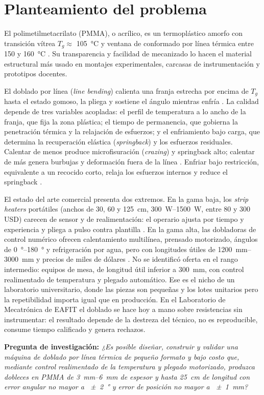 \section{Planteamiento del problema}

El polimetilmetacrilato (PMMA), o acrílico, es un termoplástico amorfo con transición vítrea $T_g \approx$ \SI{105}{\celsius} \cite{gilormini2010,brandrup1999} y ventana de conformado por línea térmica entre \num{150} y \SI{160}{\celsius} \cite{plexiglas_forming,throne2008}. Su transparencia y facilidad de mecanizado lo hacen el material estructural más usado en montajes experimentales, carcasas de instrumentación y prototipos docentes.

El doblado por línea (\emph{line bending}) calienta una franja estrecha por encima de $T_g$ hasta el estado gomoso, la pliega y sostiene el ángulo mientras enfría \cite{osswald2012,throne2008}. La calidad depende de tres variables acopladas: el perfil de temperatura a lo ancho de la franja, que fija la zona plástica; el tiempo de permanencia, que gobierna la penetración térmica y la relajación de esfuerzos; y el enfriamiento bajo carga, que determina la recuperación elástica (\emph{springback}) y los esfuerzos residuales. Calentar de menos produce microfisuración (\emph{crazing}) y springback alto; calentar de más genera burbujas y deformación fuera de la línea \cite{yan2023,plexiglas_forming}. Enfriar bajo restricción, equivalente a un recocido corto, relaja los esfuerzos internos y reduce el springback \cite{osswald2012,yan2023}.

El estado del arte comercial presenta dos extremos. En la gama baja, los \emph{strip heaters} portátiles (anchos de \num{30}, \num{60} y \SI{125}{\centi\meter}, \SIrange{300}{1500}{\watt}, entre 80 y 300 USD) carecen de sensor y de realimentación: el operario ajusta por tiempo y experiencia y pliega a pulso contra plantilla \cite{shannon_line}. En la gama alta, las dobladoras de control numérico ofrecen calentamiento multilínea, prensado motorizado, ángulos de \SIrange{0}{180}{\degree} y refrigeración por agua, pero con longitudes útiles de \SIrange{1200}{3000}{\milli\meter} y precios de miles de dólares \cite{shannon_bending,mic_auto}. No se identificó oferta en el rango intermedio: equipos de mesa, de longitud útil inferior a \SI{300}{\milli\meter}, con control realimentado de temperatura y plegado automático. Ese es el nicho de un laboratorio universitario, donde las piezas son pequeñas y los lotes unitarios pero la repetibilidad importa igual que en producción. En el Laboratorio de Mecatrónica de EAFIT el doblado se hace hoy a mano sobre resistencias sin instrumentar: el resultado depende de la destreza del técnico, no es reproducible, consume tiempo calificado y genera rechazos.

\noindent\textbf{Pregunta de investigación:} \emph{¿Es posible diseñar, construir y validar una máquina de doblado por línea térmica de pequeño formato y bajo costo que, mediante control realimentado de la temperatura y plegado motorizado, produzca dobleces en PMMA de \SIrange{3}{6}{\milli\meter} de espesor y hasta \SI{25}{\centi\meter} de longitud con error angular no mayor a \SI{\pm 2}{\degree} y error de posición no mayor a \SI{\pm 1}{\milli\meter}?}
